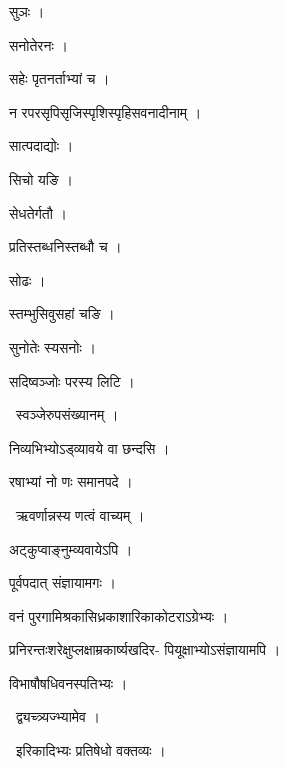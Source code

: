 \documentclass[10pt, openany, oneside]{book}
\begin{document}
\noindent सुञः ।

\noindent सनोतेरनः ।

\noindent सहेः पृतनर्ताभ्यां च ।

\noindent न रपरसृपिसृजिस्पृशिस्पृहिसवनादीनाम् ।

\noindent सात्पदाद्योः ।

\noindent सिचो यङि ।

\noindent सेधतेर्गतौ ।

\noindent प्रतिस्तब्धनिस्तब्धौ च ।

\noindent सोढः ।

\noindent स्तम्भुसिवुसहां चङि ।

\noindent सुनोतेः स्यसनोः ।

\noindent सदिष्वञ्जोः परस्य लिटि ।

\par\noindent\hspace{1.5em}{\vps वा॰}~{\qt स्वञ्जेरुपसंख्यानम् ।}

\noindent निव्यभिभ्योऽड्व्यावये वा छन्दसि ।

\noindent रषाभ्यां नो णः समानपदे ।

\par\noindent\hspace{1.5em}{\vps वा॰}~{\qt ऋवर्णान्नस्य णत्वं वाच्यम् ।}

\noindent अट्कुप्वाङ्नुम्व्यवायेऽपि ।

\noindent पूर्वपदात् संज्ञायामगः ।

\noindent वनं पुरगामिश्रकासिध्रकाशारिकाकोटराऽग्रेभ्यः ।

\noindent प्रनिरन्तःशरेक्षुप्लक्षाम्रकार्ष्यखदिर- पियूक्षाभ्योऽसंज्ञायामपि ।

\noindent विभाषौषधिवनस्पतिभ्यः ।

\par\noindent\hspace{1.5em}{\vps वा॰}~{\qt द्व्यच्त्र्यज्भ्यामेव ।}

\par\noindent\hspace{1.5em}{\vps वा॰}~{\qt इरिकादिभ्यः प्रतिषेधो वक्तव्यः ।}
\end{document}
